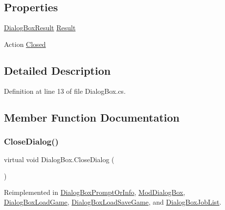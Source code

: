 \subsection*{Properties}
\begin{DoxyCompactItemize}
\item 
\hyperlink{_dialog_box_result_8cs_acd933b66f7b1c8ad36ee61780622c54f}{Dialog\+Box\+Result} \hyperlink{class_dialog_box_a6b1266a48b4fc7ca5d8b68b62310601d}{Result}
\item 
Action \hyperlink{class_dialog_box_a30361bc3dd01ebcf583344e2e5a8ca41}{Closed}
\end{DoxyCompactItemize}


\subsection{Detailed Description}


Definition at line 13 of file Dialog\+Box.\+cs.



\subsection{Member Function Documentation}
\mbox{\label{class_dialog_box_ad4f408b78d5e109525c229ad34f5a447}} 
\subsubsection{\texorpdfstring{Close\+Dialog()}{CloseDialog()}}
{\footnotesize\ttfamily virtual void Dialog\+Box.\+Close\+Dialog (\begin{DoxyParamCaption}{ }\end{DoxyParamCaption})\hspace{0.3cm}{\ttfamily [virtual]}}



Reimplemented in \hyperlink{class_dialog_box_prompt_or_info_a43847039bc30df2a99bad373312fcffb}{Dialog\+Box\+Prompt\+Or\+Info}, \hyperlink{class_mod_dialog_box_ad5168655ce50919439a1a6f2c0dcb207}{Mod\+Dialog\+Box}, \hyperlink{class_dialog_box_load_game_ad98016aa393e94764e206cc9ef47185d}{Dialog\+Box\+Load\+Game}, \hyperlink{class_dialog_box_load_save_game_ad3b5e6ab617a831b4db61010812e7665}{Dialog\+Box\+Load\+Save\+Game}, and \hyperlink{class_dialog_box_job_list_aa3d5098f6bab14d057a54df2dbd045da}{Dialog\+Box\+Job\+List}.



